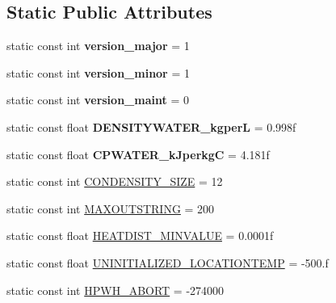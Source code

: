 \subsection*{Static Public Attributes}
\begin{DoxyCompactItemize}
\item 
\hypertarget{class_h_p_w_h_a404694da361f91cab76c434bc2e8aba7}{static const int {\bfseries version\-\_\-major} = 1}\label{class_h_p_w_h_a404694da361f91cab76c434bc2e8aba7}

\item 
\hypertarget{class_h_p_w_h_a4d21de98801ba96190a10fce9f7e0007}{static const int {\bfseries version\-\_\-minor} = 1}\label{class_h_p_w_h_a4d21de98801ba96190a10fce9f7e0007}

\item 
\hypertarget{class_h_p_w_h_af02ab978efb608dbcb3010f51fec5bee}{static const int {\bfseries version\-\_\-maint} = 0}\label{class_h_p_w_h_af02ab978efb608dbcb3010f51fec5bee}

\item 
\hypertarget{class_h_p_w_h_ad731cfda8428fb584d308f98c2eb329a}{static const float {\bfseries D\-E\-N\-S\-I\-T\-Y\-W\-A\-T\-E\-R\-\_\-kgper\-L} = 0.\-998f}\label{class_h_p_w_h_ad731cfda8428fb584d308f98c2eb329a}

\item 
\hypertarget{class_h_p_w_h_abf1c9972b0dc6bfe5ec90042d03db7f4}{static const float {\bfseries C\-P\-W\-A\-T\-E\-R\-\_\-k\-Jperkg\-C} = 4.\-181f}\label{class_h_p_w_h_abf1c9972b0dc6bfe5ec90042d03db7f4}

\item 
static const int \hyperlink{class_h_p_w_h_a545073febf9422e346d62d27093b8eb8}{C\-O\-N\-D\-E\-N\-S\-I\-T\-Y\-\_\-\-S\-I\-Z\-E} = 12
\item 
static const int \hyperlink{class_h_p_w_h_aee834cec1de7483ecf642d310a7da75f}{M\-A\-X\-O\-U\-T\-S\-T\-R\-I\-N\-G} = 200
\item 
static const float \hyperlink{class_h_p_w_h_a17bd9d54d4aa54393078e4be104675dd}{H\-E\-A\-T\-D\-I\-S\-T\-\_\-\-M\-I\-N\-V\-A\-L\-U\-E} = 0.\-0001f
\item 
static const float \hyperlink{class_h_p_w_h_aaa8fb3333f8cb5caf7ef0c92d3d8f998}{U\-N\-I\-N\-I\-T\-I\-A\-L\-I\-Z\-E\-D\-\_\-\-L\-O\-C\-A\-T\-I\-O\-N\-T\-E\-M\-P} = -\/500.f
\item 
static const int \hyperlink{class_h_p_w_h_a727a9e272cf7ac3564ebd67bfb8ed063}{H\-P\-W\-H\-\_\-\-A\-B\-O\-R\-T} = -\/274000
\end{DoxyCompactItemize}


